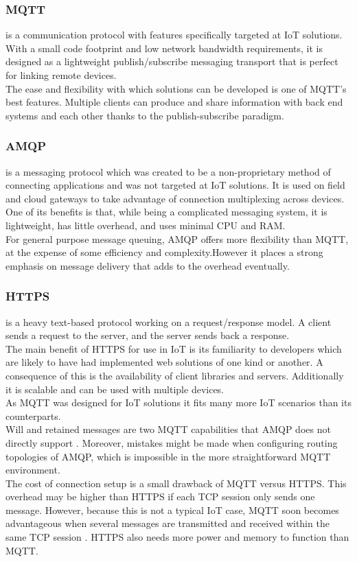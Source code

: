 \subsubsection{MQTT} is a communication protocol with features specifically targeted at IoT solutions. With a small code footprint and low network bandwidth requirements, it is designed as a lightweight publish/subscribe messaging transport that is perfect for linking remote devices.\\
The ease and flexibility with which solutions can be developed is one of MQTT's best features. Multiple clients can produce and share information with back end systems and each other thanks to the publish-subscribe paradigm.

\subsubsection{AMQP} is a messaging protocol which was created to be a non-proprietary method of connecting applications and was not targeted at IoT solutions. It is used on field and cloud gateways to take advantage of connection multiplexing across devices. One of its benefits is that, while being a complicated messaging system, it is lightweight, has little overhead, and uses minimal CPU and RAM. \\
For general purpose message queuing, AMQP offers more flexibility than MQTT, at the expense of some efficiency and complexity.However it places a strong emphasis on message delivery that adds to the overhead eventually.

\subsubsection{HTTPS} is a heavy text-based protocol working on a request/response model. A client sends a request to the server, and the server sends back a response.\\
The main benefit of HTTPS for use in IoT is its familiarity to developers which are likely to have had implemented web solutions of one kind or another. A consequence of this is the availability of client libraries and servers. Additionally it is scalable and can be used with multiple devices.\\


As MQTT was designed for IoT solutions it fits many more IoT scenarios than its counterparts. \\
Will and retained messages are two MQTT capabilities that AMQP does not directly support \cite{b2}. Moreover, mistakes might be made when configuring routing topologies of AMQP, which is impossible in the more straightforward MQTT environment.\\
The cost of connection setup is a small drawback of MQTT versus HTTPS. This overhead may be higher than HTTPS if each TCP session only sends one message. However, because this is not a typical IoT case, MQTT soon becomes advantageous when several messages are transmitted and received within the same TCP session \cite{b3}. HTTPS also needs more power and memory to function than MQTT.\\

